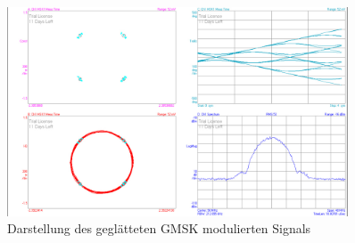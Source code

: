 \documentclass[12pt,a4paper,ngerman]{article}
\begin{document}
\begin{figure}[H]
\centering
\includegraphics[width=0.9\textwidth]{figures/Aufgabe3_GMSK_avg.jpg} 
\caption{Darstellung des geglätteten GMSK modulierten Signals}
\label{fig:3_GMSK_avg}
\end{figure}

\pagebreak
\end{document}
